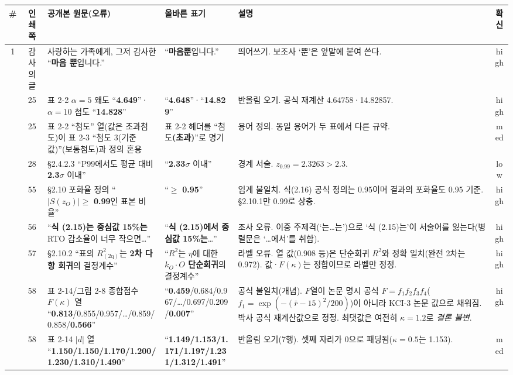 \documentclass[11pt,a4paper]{article}
\renewcommand{\arraystretch}{1.35}
\newcommand{\err}[1]{{\color{errred}\textbf{#1}}}
\begin{document}
\renewcommand{\arraystretch}{1.5}
\begin{longtable}{@{}c c >{\RaggedRight}p{4.6cm} >{\RaggedRight}p{3.0cm} >{\RaggedRight}p{3.4cm} c@{}}
\toprule
\textbf{\#} & \textbf{인쇄쪽} & \textbf{공개본 원문(오류)} & \textbf{올바른 표기} & \textbf{설명} & \textbf{확신} \\
\midrule
\endhead
1 & 감사의 글 & 사랑하는 가족에게, 그저 감사한 ``\err{마음 뿐}입니다.'' & ``\err{마음뿐}입니다.'' & 띄어쓰기. 보조사 `뿐'은 앞말에 붙여 쓴다. & high \\
\addlinespace
2 & 25 & 표 2-2 $\alpha{=}5$ 왜도 ``\err{4.649}''·$\alpha{=}10$ 첨도 ``\err{14.828}'' & ``\err{4.648}''·``\err{14.829}'' & 반올림 오기. 공식 재계산 4.64758·14.82857. & high \\
\addlinespace
3 & 25 & 표 2-2 ``첨도'' 열(값은 초과첨도)이 표 2-3 ``첨도 3(기준값)''(보통첨도)과 정의 혼용 & 표 2-2 헤더를 ``첨도\err{(초과)}''로 명기 & 용어 정의. 동일 용어가 두 표에서 다른 규약. & med \\
\addlinespace
4 & 28 & \S2.4.2.3 ``P99에서도 평균 대비 \err{2.3}$\sigma$ 이내'' & ``\err{2.33}$\sigma$ 이내'' & 경계 서술. $z_{0.99}=2.3263>2.3$. & low \\
\addlinespace
5 & 55 & \S2.10 포화율 정의 ``$|S(z_O)|\geq$ \err{0.99}인 표본 비율'' & ``$\geq$ \err{0.95}'' & 임계 불일치. 식(2.16) 공식 정의는 0.95이며 결과의 포화율도 0.95 기준. \S2.10.1만 0.99로 상충. & high \\
\addlinespace
6 & 56 & ``\err{식 (2.15)는 중심값 15\%는} RTO 감소율이 너무 작으면…'' & ``\err{식 (2.15)에서 중심값 15\%는}…'' & 조사 오류. 이중 주제격(`는…는')으로 `식 (2.15)는'이 서술어를 잃는다(병렬문은 `…에서'를 취함). & high \\
\addlinespace
7 & 57 & \S2.10.2 ``표의 $R^2_{(2\mathrm{q})}$는 \err{2차 다항 회귀}의 결정계수'' & ``$R^2$는 $\eta$에 대한 \err{$k_O\!\cdot\!O$ 단순회귀}의 결정계수'' & 라벨 오류. 열 값(0.908 등)은 단순회귀 $R^2$와 정확 일치(완전 2차는 0.972). 값·$F(\kappa)$는 정합이므로 라벨만 정정. & high \\
\addlinespace
8 & 58 & 표 2-14/그림 2-8 종합점수 $F(\kappa)$ 열 ``\err{0.813}/0.855/0.957/…/0.859/0.858/\err{0.566}'' & ``\err{0.459}/0.684/0.967/…/0.697/0.209/\err{0.007}'' & 공식 불일치(개념). $F$열이 논문 명시 공식 $F{=}f_1 f_2 f_3 f_4$($f_1{=}\exp(-(\bar r-15)^2/200)$)이 아니라 KCI-3 논문 값으로 채워짐. 박사 공식 재계산값으로 정정. 최댓값은 여전히 $\kappa{=}1.2$로 \emph{결론 불변}. & high \\
\addlinespace
9 & 58 & 표 2-14 $|d|$ 열 ``\err{1.150/1.150/1.170/1.200/1.230/1.310/1.490}'' & ``\err{1.149/1.153/1.171/1.197/1.231/1.312/1.491}'' & 반올림 오기(7행). 셋째 자리가 0으로 패딩됨($\kappa{=}0.5$는 1.153). & med \\

\end{longtable}
\end{document}
